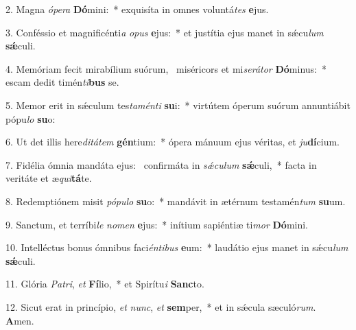 2. Magna \textit{ó}\textit{pe}\textit{ra} \textbf{Dó}mini:~*  exquisíta in omnes voluntá\textit{tes} \textbf{e}jus.\

3. Conféssio et magnificénti\textit{a} \textit{o}\textit{pus} \textbf{e}jus:~*  et justítia ejus manet in sǽcu\textit{lum} \textbf{sǽ}culi.\

4. Memóriam fecit mirabílium suórum, \dag\  miséricors et mi\textit{se}\textit{rá}\textit{tor} \textbf{Dó}minus:~*  escam dedit timén\textit{ti}\textbf{bus} se.\

5. Memor erit in sǽculum tes\textit{ta}\textit{mén}\textit{ti} \textbf{su}i:~*  virtútem óperum suórum annuntiábit pópu\textit{lo} \textbf{su}o:\

6. Ut det illis here\textit{di}\textit{tá}\textit{tem} \textbf{gén}tium:~*  ópera mánuum ejus véritas, et \textit{ju}\textbf{dí}cium.\

7. Fidélia ómnia mandáta ejus: \dag\  confirmáta in \textit{sǽ}\textit{cu}\textit{lum} \textbf{sǽ}culi,~*  facta in veritáte et æ\textit{qui}\textbf{tá}te.\

8. Redemptiónem misit \textit{pó}\textit{pu}\textit{lo} \textbf{su}o:~*  mandávit in ætérnum testamén\textit{tum} \textbf{su}um.\

9. Sanctum, et terríbi\textit{le} \textit{no}\textit{men} \textbf{e}jus:~*  inítium sapiéntiæ ti\textit{mor} \textbf{Dó}mini.\

10. Intelléctus bonus ómnibus faci\textit{én}\textit{ti}\textit{bus} \textbf{e}um:~*  laudátio ejus manet in sǽcu\textit{lum} \textbf{sǽ}culi.\

11. Glória \textit{Pa}\textit{tri}, \textit{et} \textbf{Fí}lio,~*  et Spirítu\textit{i} \textbf{Sanc}to.\

12. Sicut erat in princípio, \textit{et} \textit{nunc}, \textit{et} \textbf{sem}per,~*  et in sǽcula sæculó\textit{rum}. \textbf{A}men.\

